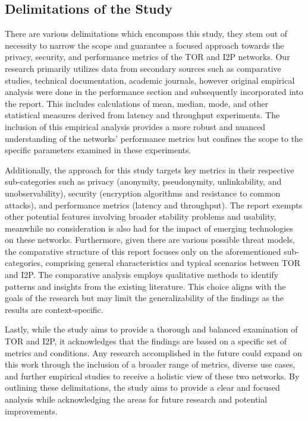 \documentclass[12pt,conference]{IEEEtran}
\begin{document}
\subsection{Delimitations of the Study}
There are various delimitations which encompass this study, they stem out of necessity to narrow the scope and guarantee a focused approach towards the privacy, security, and performance metrics of the TOR and I2P networks. Our research primarily utilizes data from secondary sources such as comparative studies, technical documentation, academic journals, however original empirical analysis were done in the performance section and subsequently incorporated into the report. This includes calculations of mean, median, mode, and other statistical measures derived from latency and throughput experiments. The inclusion of this empirical analysis provides a more robust and nuanced understanding of the networks' performance metrics but confines the scope to the specific parameters examined in these experiments.

Additionally, the approach for this study targets key metrics in their respective sub-categories such as privacy (anonymity, pseudonymity, unlinkability, and unobservability), security (encryption algorithms and resistance to common attacks), and performance metrics (latency and throughput). The report exempts other potential features involving broader stability problems and usability, meanwhile no consideration is also had for the impact of emerging technologies on these networks. Furthermore, given there are various possible threat models, the comparative structure of this report focuses only on the aforementioned sub-categories, comprising general characteristics and typical scenarios between TOR and I2P. The comparative analysis employs qualitative methods to identify patterns and insights from the existing literature. This choice aligns with the goals of the research but may limit the generalizability of the findings as the results are context-specific.

 Lastly, while the study aims to provide a thorough and balanced examination of TOR and I2P, it acknowledges that the findings are based on a specific set of metrics and conditions. Any research accomplished in the future could expand on this work through the inclusion of a broader range of metrics, diverse use cases, and further empirical studies to receive a holistic view of these two networks. By outlining these delimitations, the study aims to provide a clear and focused analysis while acknowledging the areas for future research and potential improvements.
\end{document}
